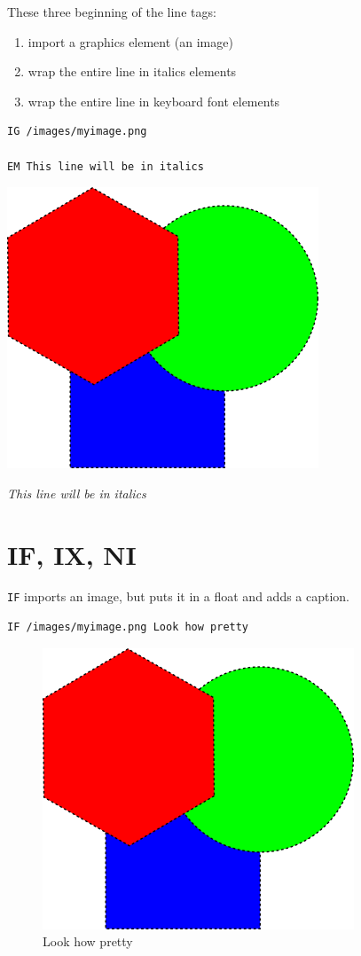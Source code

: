These three beginning of the line tags:

\begin{enumerate}
\item import a graphics element (an image)
\item wrap the entire line in italics elements
\item wrap the entire line in keyboard font elements
\end{enumerate}

\begin{verbatim}
IG /images/myimage.png

EM This line will be in italics
\end{verbatim}

\includegraphics{images/myimage.png}

\emph{This line will be in italics}

\section{IF, IX, NI}
\label{if-ix-ni}

\texttt{IF} imports an image, but puts it in a float and adds a caption.

\begin{verbatim}
IF /images/myimage.png Look how pretty
\end{verbatim}

\begin{figure}[h!]\includegraphics{images/myimage.png}\captionsetup{labelformat=empty}\caption{Look how pretty}\label{fig:look-how-pretty}\end{figure}

